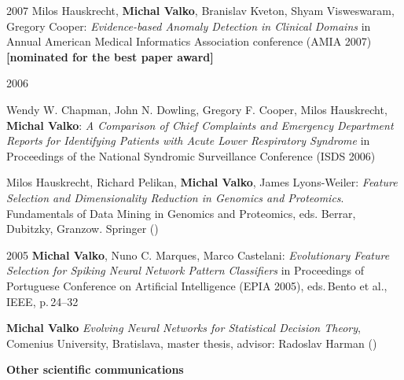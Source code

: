 \documentclass{resume}
\begin{document}
\begin{category}{2007}
\citembullet   
Milos Hauskrecht, {\bf Michal Valko}, Branislav Kveton, Shyam Visweswaram, Gregory Cooper:
\emph{Evidence-based Anomaly Detection in Clinical Domains} in Annual American Medical Informatics
Association conference ({\sf AMIA 2007}) {\bf [nominated for the best paper award]}
\end{category}
\begin{category}{2006}

\citembullet  
Wendy W. Chapman, John N. Dowling, Gregory F. Cooper, Milos Hauskrecht, {\bf Michal Valko}: \emph{A Comparison of Chief Complaints and Emergency Department Reports for Identifying Patients with Acute Lower Respiratory Syndrome} in Proceedings of the National Syndromic Surveillance Conference ({\sf ISDS 2006})

\citembullet  
Milos Hauskrecht, Richard Pelikan, {\bf Michal Valko}, James Lyons-Weiler:
\emph{Feature Selection and Dimensionality Reduction in Genomics and
Proteomics}. Fundamentals of Data Mining in Genomics and Proteomics,
eds. Berrar, Dubitzky, Granzow. Springer ({})

\end{category}
\begin{category}{2005}
\citembullet 
{\bf Michal Valko}, Nuno C. Marques, Marco Castelani: \emph{Evolutionary Feature
Selection for Spiking Neural Network Pattern Classifiers} in
Proceedings of Portuguese Conference on Artificial Intelligence
({\sf EPIA 2005}), eds.\,Bento et al., IEEE, p.\,24--32

\citembullet 
{\bf Michal Valko} \emph{Evolving Neural Networks for Statistical Decision
Theory}, Comenius University, Bratislava, master thesis, advisor: Radoslav Harman ({})

\end{category}

\begin{flushleft} 
\textbf{\sc Other scientific communications}
\end{flushleft} 
\end{document}
